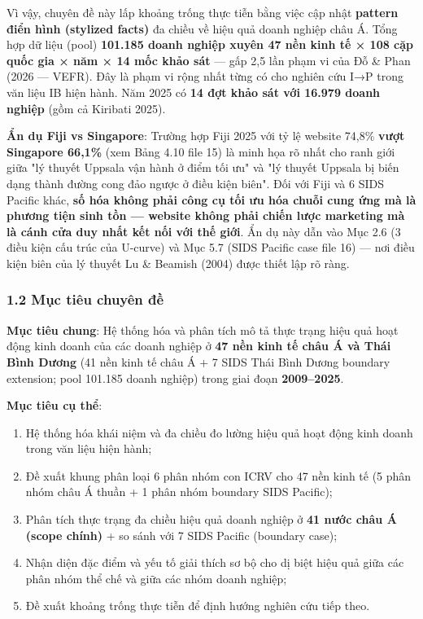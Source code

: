\documentclass[12pt,a4paper]{article}
\providecommand{\tightlist}{\setlength{\itemsep}{0pt}\setlength{\parskip}{0pt}}
\begin{document}
Vì vậy, chuyên đề này lấp khoảng trống thực tiễn bằng việc cập nhật
\textbf{pattern điển hình (stylized facts)} đa chiều về hiệu quả doanh
nghiệp châu Á. Tổng hợp dữ liệu (pool) \textbf{101.185 doanh nghiệp
xuyên 47 nền kinh tế × 108 cặp quốc gia × năm × 14 mốc khảo sát} --- gấp
2,5 lần phạm vi của Đỗ \& Phan (2026 --- VEFR). Đây là phạm vi rộng nhất
từng có cho nghiên cứu I→P trong văn liệu IB hiện hành. Năm 2025 có
\textbf{14 đợt khảo sát với 16.979 doanh nghiệp} (gồm cả Kiribati 2025).

\textbf{Ẩn dụ Fiji vs Singapore}: Trường hợp Fiji 2025 với tỷ lệ website
74,8\% \textbf{vượt Singapore 66,1\%} (xem Bảng 4.10 file 15) là minh
họa rõ nhất cho ranh giới giữa "lý thuyết Uppsala vận hành ở điểm tối
ưu" và "lý thuyết Uppsala bị biến dạng thành đường cong đảo ngược ở điều
kiện biên". Đối với Fiji và 6 SIDS Pacific khác, \textbf{số hóa không
phải công cụ tối ưu hóa chuỗi cung ứng mà là phương tiện sinh tồn ---
website không phải chiến lược marketing mà là cánh cửa duy nhất kết nối
với thế giới}. Ẩn dụ này dẫn vào Mục 2.6 (3 điều kiện cấu trúc của
U-curve) và Mục 5.7 (SIDS Pacific case file 16) --- nơi điều kiện biên
của lý thuyết Lu \& Beamish (2004) được thiết lập rõ ràng.

\hypertarget{12-mux1ee5c-tiuxeau-chuyuxean-ux111ux1ec1}{%
\subsubsection{1.2 Mục tiêu chuyên
đề}\label{12-mux1ee5c-tiuxeau-chuyuxean-ux111ux1ec1}}

\textbf{Mục tiêu chung}: Hệ thống hóa và phân tích mô tả thực trạng hiệu
quả hoạt động kinh doanh của các doanh nghiệp ở \textbf{47 nền kinh tế
châu Á và Thái Bình Dương} (41 nền kinh tế châu Á + 7 SIDS Thái Bình
Dương boundary extension; pool 101.185 doanh nghiệp) trong giai đoạn
\textbf{2009--2025}.

\textbf{Mục tiêu cụ thể}:

\begin{enumerate}
\def\labelenumi{\arabic{enumi}.}
\tightlist
\item
  Hệ thống hóa khái niệm và đa chiều đo lường hiệu quả hoạt động kinh
  doanh trong văn liệu hiện hành;
\item
  Đề xuất khung phân loại 6 phân nhóm con ICRV cho 47 nền kinh tế (5
  phân nhóm châu Á thuần + 1 phân nhóm boundary SIDS Pacific);
\item
  Phân tích thực trạng đa chiều hiệu quả doanh nghiệp ở \textbf{41 nước
  châu Á (scope chính)} + so sánh với 7 SIDS Pacific (boundary case);
\item
  Nhận diện đặc điểm và yếu tố giải thích sơ bộ cho dị biệt hiệu quả
  giữa các phân nhóm thể chế và giữa các nhóm doanh nghiệp;
\item
  Đề xuất khoảng trống thực tiễn để định hướng nghiên cứu tiếp theo.
\end{enumerate}
\end{document}
